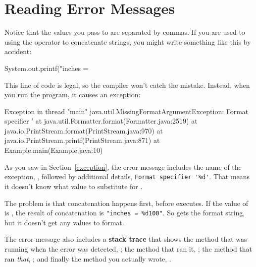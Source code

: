 \section{Reading Error Messages}

Notice that the values you pass to  are separated by commas.
If you are used to using the \java{+} operator to concatenate strings, you might write something like this by accident:

\begin{code}
System.out.printf("inches = %
\end{code}

This line of code is legal, so the compiler won't catch the mistake.
Instead, when you run the program, it causes an exception:


\begin{small}
\begin{stdout}
Exception in thread "main" java.util.MissingFormatArgumentException:
Format specifier '%
    at java.util.Formatter.format(Formatter.java:2519)
    at java.io.PrintStream.format(PrintStream.java:970)
    at java.io.PrintStream.printf(PrintStream.java:871)
    at Example.main(Example.java:10)
\end{stdout}
\end{small}

As you saw in Section~\ref{exception}, the error message includes the name of the exception, , followed by additional details, \verb"Format specifier '%d'".
That means it doesn't know what value to substitute for .


The problem is that concatenation happens first, before  executes.
If the value of  is , the result of concatenation is \verb'"inches = %d100"'.
So  gets the format string, but it doesn't get any values to format.


The error message also includes a {\bf stack trace} that shows the method that was running when the error was detected, ; the method that ran it, ; the method that ran {\em that}, ; and finally the method you actually wrote, .

